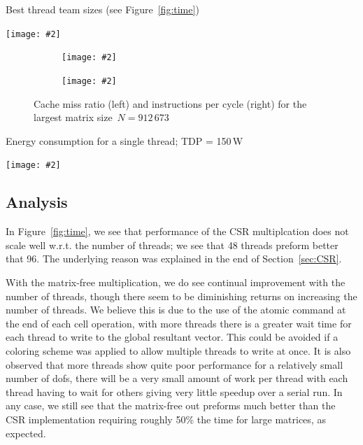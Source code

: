 \documentclass[12pt]{article}
\newcommand{\includegraphicsw}[2][1.]{\texttt{[image: \#2]}}
\newcommand{\dimSize}{N}
\begin{document}
\begin{table}[H]
	\centering\caption{Best thread team sizes (see Figure~\ref{fig:time})}
	\includegraphicsw[.9]{bestTime.pdf}
\end{table}

\begin{figure}[H]
	\centering
	\begin{subfigure}{.5\linewidth}
		\includegraphicsw{cache.pdf}
	\end{subfigure}%
	\begin{subfigure}{.5\linewidth}
		\includegraphicsw{inst.pdf}
	\end{subfigure}
	\caption{Cache miss ratio (left) and instructions per cycle (right) for the largest matrix size~${\dimSize = 912\,673}$}\label{fig:cache}
\end{figure}

\begin{table}[H]
	\centering\caption{Energy consumption for a single thread; TDP = 150\,W}\label{fig:rapl}
	\includegraphicsw[.9]{rapl.pdf}
\end{table}

\subsection{Analysis}
In Figure~\ref{fig:time}, we see that performance of the CSR multiplcation does not scale well w.r.t. the number of threads; we see that 48 threads preform better that 96. The underlying reason was explained in the end of Section~\ref{sec:CSR}.

With the matrix-free multiplication, we do see continual improvement with the number of threads, though there seem to be diminishing returns on increasing the number of threads. We believe this is due to the use of the atomic command at the end of each cell operation, with more threads there is a greater wait time for each thread to write to the global resultant vector. This could be avoided if a coloring scheme was applied to allow multiple threads to write at once. It is also observed that more threads show quite poor performance for a relatively small number of dofs, there will be a very small amount of work per thread with each thread having to wait for others giving very little speedup over a serial run. In any case, we still see that the matrix-free out preforms much better than the CSR implementation requiring roughly 50\% the time for large matrices, as expected.
\end{document}
